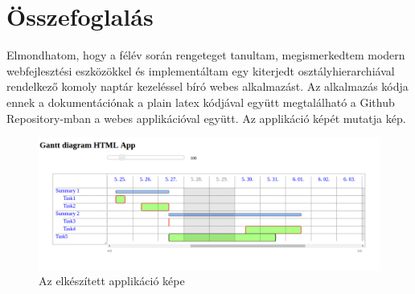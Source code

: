 \chapter{Összefoglalás}\label{sect:Summary}

\hspace{2mm} Elmondhatom, hogy a félév során rengeteget tanultam, megismerkedtem modern webfejlesztési eszközökkel és implementáltam egy kiterjedt osztályhierarchiával rendelkező komoly naptár kezeléssel bíró webes alkalmazást. Az alkalmazás kódja ennek a dokumentációnak a plain latex kódjával együtt megtalálható a Github Repository-mban \cite{TDoneRepo}  a webes applikációval együtt. \cite{TDoneWeb} Az applikáció képét mutatja  kép.

\begin{figure}[!ht]
\centering
\includegraphics[width=\textwidth, keepaspectratio]{figures/application.png}
\caption{Az elkészített applikáció képe} 
\label{fig:App}
\end{figure} 

